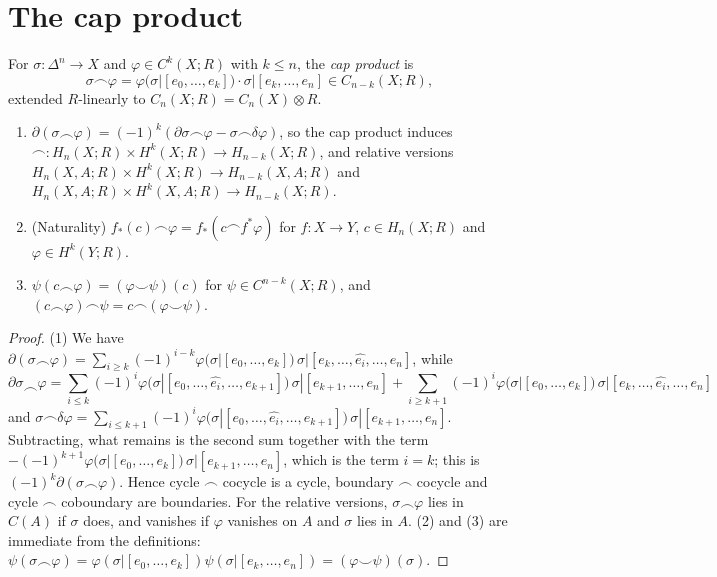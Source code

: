 \section{The cap product}\label{singular-cohomology:section-cap}

\begin{definition}\label{singular-cohomology:definition-cap}
For $\sigma \colon \Delta^n \to X$ and $\varphi \in C^k(X; R)$ with $k \leq n$, the \emph{cap product} is
\[
\sigma \frown \varphi = \varphi(\sigma|[e_0, \ldots, e_k]) \cdot \sigma|[e_k, \ldots, e_n] \in C_{n-k}(X; R),
\]
extended $R$-linearly to $C_n(X; R) = C_n(X) \otimes R$.
\end{definition}

\begin{proposition}\label{singular-cohomology:proposition-cap}
\begin{enumerate}
\item $\partial(\sigma \frown \varphi) = (-1)^k(\partial\sigma \frown \varphi - \sigma \frown \delta\varphi)$, so the cap product induces
$\frown \colon H_n(X; R) \times H^k(X; R) \to H_{n-k}(X; R)$, and relative versions $H_n(X, A; R) \times H^k(X; R) \to H_{n-k}(X, A; R)$ and
$H_n(X, A; R) \times H^k(X, A; R) \to H_{n-k}(X; R)$.
\item (Naturality) $f_*(c) \frown \varphi = f_*(c \frown f^*\varphi)$ for $f \colon X \to Y$, $c \in H_n(X; R)$ and $\varphi \in H^k(Y; R)$.
\item $\psi(c \frown \varphi) = (\varphi \smile \psi)(c)$ for $\psi \in C^{n-k}(X; R)$, and $(c \frown \varphi) \frown \psi = c \frown (\varphi \smile \psi)$.
\end{enumerate}
\end{proposition}

\begin{proof}
(1) We have
$\partial(\sigma \frown \varphi) = \sum_{i \geq k}(-1)^{i-k}\varphi(\sigma|[e_0, \ldots, e_k])\,\sigma|[e_k, \ldots, \widehat{e_i}, \ldots, e_n]$, while
\[
\partial\sigma \frown \varphi = \sum_{i \leq k}(-1)^i\varphi(\sigma|[e_0, \ldots, \widehat{e_i}, \ldots, e_{k+1}])\,\sigma|[e_{k+1}, \ldots, e_n]
+ \sum_{i \geq k+1}(-1)^i\varphi(\sigma|[e_0, \ldots, e_k])\,\sigma|[e_k, \ldots, \widehat{e_i}, \ldots, e_n]
\]
and $\sigma \frown \delta\varphi = \sum_{i \leq k+1}(-1)^i\varphi(\sigma|[e_0, \ldots, \widehat{e_i}, \ldots, e_{k+1}])\,\sigma|[e_{k+1}, \ldots, e_n]$. Subtracting, what remains is the
second sum together with the term $-(-1)^{k+1}\varphi(\sigma|[e_0, \ldots, e_k])\,\sigma|[e_{k+1}, \ldots, e_n]$, which is the term $i = k$; this is
$(-1)^k\partial(\sigma \frown \varphi)$. Hence cycle $\frown$ cocycle is a cycle, boundary $\frown$ cocycle and cycle $\frown$ coboundary are boundaries. For the relative
versions, $\sigma \frown \varphi$ lies in $C(A)$ if $\sigma$ does, and vanishes if $\varphi$ vanishes on $A$ and $\sigma$ lies in $A$. (2) and (3) are immediate from the
definitions: $\psi(\sigma \frown \varphi) = \varphi(\sigma|[e_0, \ldots, e_k])\psi(\sigma|[e_k, \ldots, e_n]) = (\varphi \smile \psi)(\sigma)$.
\end{proof}

